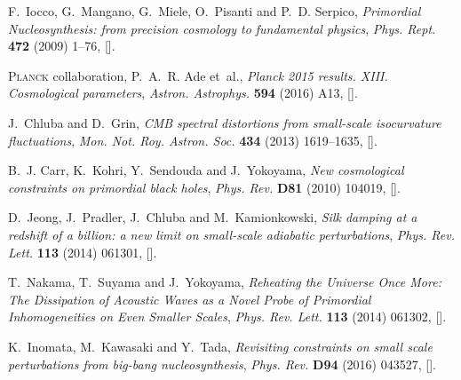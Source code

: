 \documentclass[11pt,a4paper]{article}
\begin{document}
\providecommand{\href}[2]{#2}\begingroup\raggedright\begin{thebibliography}{10}

F.~Iocco, G.~Mangano, G.~Miele, O.~Pisanti and P.~D. Serpico, \emph{{Primordial
  Nucleosynthesis: from precision cosmology to fundamental physics}},
  \href{https://doi.org/10.1016/j.physrep.2009.02.002}{\emph{Phys. Rept.}
  {\bfseries 472} (2009) 1--76},
  [\href{https://arxiv.org/abs/0809.0631}{{}}].

{\scshape Planck} collaboration, P.~A.~R. Ade et~al., \emph{{Planck 2015
  results. XIII. Cosmological parameters}},
  \href{https://doi.org/10.1051/0004-6361/201525830}{\emph{Astron. Astrophys.}
  {\bfseries 594} (2016) A13},
  [\href{https://arxiv.org/abs/1502.01589}{{}}].

J.~Chluba and D.~Grin, \emph{{CMB spectral distortions from small-scale
  isocurvature fluctuations}},
  \href{https://doi.org/10.1093/mnras/stt1129}{\emph{Mon. Not. Roy. Astron.
  Soc.} {\bfseries 434} (2013) 1619--1635},
  [\href{https://arxiv.org/abs/1304.4596}{{}}].

B.~J. Carr, K.~Kohri, Y.~Sendouda and J.~Yokoyama, \emph{{New cosmological
  constraints on primordial black holes}},
  \href{https://doi.org/10.1103/PhysRevD.81.104019}{\emph{Phys. Rev.}
  {\bfseries D81} (2010) 104019},
  [\href{https://arxiv.org/abs/0912.5297}{{}}].

D.~Jeong, J.~Pradler, J.~Chluba and M.~Kamionkowski, \emph{{Silk damping at a
  redshift of a billion: a new limit on small-scale adiabatic perturbations}},
  \href{https://doi.org/10.1103/PhysRevLett.113.061301}{\emph{Phys. Rev. Lett.}
  {\bfseries 113} (2014) 061301},
  [\href{https://arxiv.org/abs/1403.3697}{{}}].

T.~Nakama, T.~Suyama and J.~Yokoyama, \emph{{Reheating the Universe Once More:
  The Dissipation of Acoustic Waves as a Novel Probe of Primordial
  Inhomogeneities on Even Smaller Scales}},
  \href{https://doi.org/10.1103/PhysRevLett.113.061302}{\emph{Phys. Rev. Lett.}
  {\bfseries 113} (2014) 061302},
  [\href{https://arxiv.org/abs/1403.5407}{{}}].

K.~Inomata, M.~Kawasaki and Y.~Tada, \emph{{Revisiting constraints on small
  scale perturbations from big-bang nucleosynthesis}},
  \href{https://doi.org/10.1103/PhysRevD.94.043527}{\emph{Phys. Rev.}
  {\bfseries D94} (2016) 043527},
  [\href{https://arxiv.org/abs/1605.04646}{{}}].


\end{thebibliography}
\end{document}
